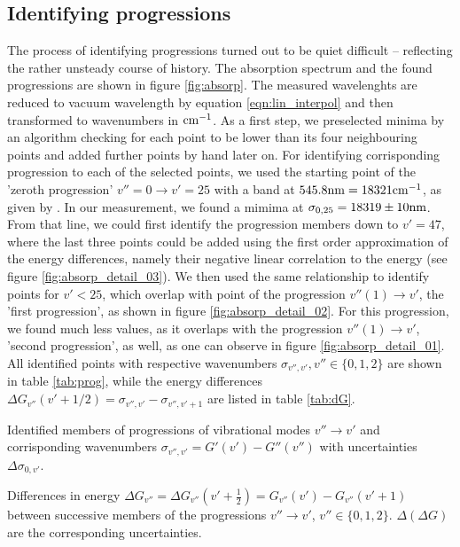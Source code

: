 \subsection{Identifying progressions}
The process of identifying progressions turned out to be quiet difficult – reflecting the 
rather unsteady course of history. 
The absorption spectrum and the found progressions are shown in figure \ref{fig:absorp}.
The measured wavelenghts are reduced to vacuum wavelength by equation \eqref{eqn:lin_interpol} 
and then transformed to wavenumbers in $\mathrm{cm^{-1}}$. 
As a first step, we preselected minima by an algorithm checking for each point to be lower than 
its four neighbouring points and added further points by hand later on. For identifying corrisponding 
progression to each of the selected points, we used the starting point of the 'zeroth progression' 
$v'' = 0  \rightarrow v' = 25$ with a band at $545.8 \mathrm{nm} = 18321 \mathrm{cm^{-1}}$, as given by \cite{}. In our 
measurement, we found a mimima at $\sigma_{0, 25} = 18319 \pm 10\mathrm{nm}$. From that line, we could first 
identify the progression members down to $v' = 47$, where the last three points could be added using 
the first order approximation of the energy differences, namely their negative linear correlation 
to the energy (see figure \ref{fig:absorp_detail_03}). We then used the same relationship to identify 
points for $v' < 25$, which overlap with point of the progression $v''(1) \rightarrow v'$, the 
'first progression', 
as shown in figure \ref{fig:absorp_detail_02}. For this progression, we found much less values, as 
it overlaps with the progression $v''(1) \rightarrow v'$, 'second progression', as well, as one can 
observe in figure \ref{fig:absorp_detail_01}. All identified points with respective wavenumbers 
$\sigma_{v'', v'}, v'' \in \{0, 1, 2\}$ are shown in table \ref{tab:prog}, 
while the energy differences $\Delta G_{v''}(v' + 1 / 2) = \sigma_{v'', v'} - \sigma_{v'', v' + 1}$ are 
listed in table \ref{tab:dG}.

\begin{table}[h]
\centering
\small

\caption{Identified members of progressions of vibrational modes $v'' \rightarrow v'$ 
and corrisponding wavenumbers $\sigma_{v'', v'} = G'(v') - G''(v'')$ with uncertainties
$\Delta \sigma_{0, v'}$. }
\label{tab:prog}
\end{table}

\begin{table}[h]
\centering
\small

\caption{Differences in energy 
$\Delta G_{v''} = \Delta G_{v''} (v' + \frac{1}{2}) = G_{v''}(v') - G_{v''}(v' + 1)$ 
between successive members of the progressions $v'' \rightarrow v'$, $v'' \in \{0, 1, 2\}$. 
$ \Delta (\Delta G) $ are the corresponding uncertainties. 
 }
\label{tab:dG}
\end{table}

